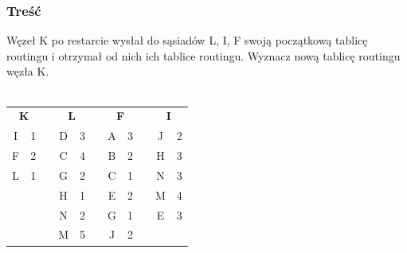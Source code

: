 \documentclass[a4paper,twoside]{article}
\begin{document}
\subsubsection{Treść}
Węzeł K po restarcie wysłał do sąsiadów L, I, F swoją początkową tablicę routingu i otrzymał od nich ich tablice routingu. Wyznacz nową tablicę routingu węzła K.\\\\
\begin{tabular}{cc m{1cm}|c|c|c|c|c|ccc}
	\cline{1-2} \cline{4-5} \cline{7-8} \cline{10-11}
	\multicolumn{2}{|c|}{\textbf{K}}                 &  & \multicolumn{2}{c|}{\textbf{L}} &  & \multicolumn{2}{c|}{\textbf{F}} & \multicolumn{1}{c|}{} & \multicolumn{2}{c|}{\textbf{I}}                 \\ \cline{1-2} \cline{4-5} \cline{7-8} \cline{10-11} 
	\multicolumn{1}{|c|}{I} & \multicolumn{1}{c|}{1} &  & D              & 3              &  & A              & 3              & \multicolumn{1}{c|}{} & \multicolumn{1}{c|}{J} & \multicolumn{1}{c|}{2} \\ \cline{1-2} \cline{4-5} \cline{7-8} \cline{10-11} 
	\multicolumn{1}{|c|}{F} & \multicolumn{1}{c|}{2} &  & C              & 4              &  & B              & 2              & \multicolumn{1}{c|}{} & \multicolumn{1}{c|}{H} & \multicolumn{1}{c|}{3} \\ \cline{1-2} \cline{4-5} \cline{7-8} \cline{10-11} 
	\multicolumn{1}{|c|}{L} & \multicolumn{1}{c|}{1} &  & G              & 2              &  & C              & 1              & \multicolumn{1}{c|}{} & \multicolumn{1}{c|}{N} & \multicolumn{1}{c|}{3} \\ \cline{1-2} \cline{4-5} \cline{7-8} \cline{10-11} 
	&                        &  & H              & 1              &  & E              & 2              & \multicolumn{1}{c|}{} & \multicolumn{1}{c|}{M} & \multicolumn{1}{c|}{4} \\ \cline{4-5} \cline{7-8} \cline{10-11} 
	&                        &  & N              & 2              &  & G              & 1              & \multicolumn{1}{c|}{} & \multicolumn{1}{c|}{E} & \multicolumn{1}{c|}{3} \\ \cline{4-5} \cline{7-8} \cline{10-11} 
	&                        &  & M              & 5              &  & J              & 2              &                       &                        &                        \\ \cline{4-5} \cline{7-8}
\end{tabular}
\end{document}
